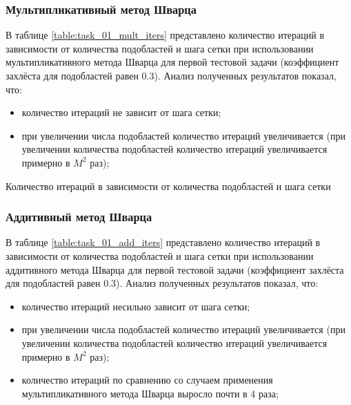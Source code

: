 \documentclass[a4paper]{article}
\begin{document}
\newpage

\subsubsection{Мультипликативный метод Шварца}

В таблице \ref{table:task_01_mult_iters} представлено количество итераций в зависимости от количества подобластей и шага сетки при использовании мультипликативного метода Шварца для первой тестовой задачи (коэффициент захлёста для подобластей равен 0.3). Анализ полученных результатов показал, что:
\begin{itemize}
\item количество итераций не зависит от шага сетки;
\item при увеличении числа подобластей количество итераций увеличивается (при увеличении количества подобластей количество итераций увеличивается примерно в $M^2$ раз);
\end{itemize}

\begin{table}[h]
\caption{Количество итераций в зависимости от количества подобластей и шага сетки}
\label{table:task_01_mult_iters}
\end{table}

\newpage

\subsubsection{Аддитивный метод Шварца}

В таблице \ref{table:task_01_add_iters} представлено количество итераций в зависимости от количества подобластей и шага сетки при использовании аддитивного метода Шварца для первой тестовой задачи (коэффициент захлёста для подобластей равен 0.3). Анализ полученных результатов показал, что:
\begin{itemize}
\item количество итераций несильно зависит от шага сетки;
\item при увеличении числа подобластей количество итераций увеличивается (при увеличении количества подобластей количество итераций увеличивается примерно в $M^2$ раз);
\item количество итераций по сравнению со случаем применения мультипликативного метода Шварца выросло почти в 4 раза;
\end{itemize}
\end{document}
